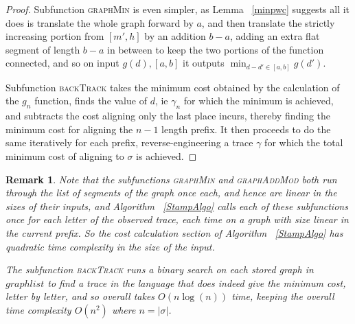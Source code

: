 \documentclass[conference]{IEEEtran}
\newtheorem{remark}{Remark}
\begin{document}
\begin{proof}
		Subfunction \textsc{graphMin} is even simpler, as Lemma ~\ref{minpwc} suggests all it does is translate the whole graph forward by $a$, and then translate the strictly increasing portion from $[m', h]$ by an addition $b-a$, adding an extra flat segment of length $b-a$ in between to keep the two portions of the function connected, and so on input $g(d), [a, b]$ it outputs $\min_{d-d' \in [a,b]}{g(d')}$. 
		
		Subfunction \textsc{backTrack} takes the minimum cost obtained by the calculation of the $g_n$ function, finds the value of $d$, ie $\gamma_n$ for which the minimum is achieved, and subtracts the cost aligning only the last place incurs, thereby finding the minimum cost for aligning the $n-1$ length prefix. 
		It then proceeds to do the same iteratively for each prefix, reverse-engineering a trace $\gamma$ for which the total minimum cost of aligning to $\sigma$ is achieved. 
		
	\end{proof}
	

		\begin{remark} Note that the subfunctions \textsc{graphMin} and  \textsc{graphAddMod} both run through the list of segments of the graph once each, and hence are linear in the sizes of their inputs, and Algorithm ~\ref{StampAlgo} calls each of these subfunctions once for each letter of the observed trace, each time on a graph with size linear in the current prefix.  
			So the cost calculation section of Algorithm ~\ref{StampAlgo} has quadratic time complexity in the size of the input. 
			
			The subfunction \textsc{backTrack} runs a binary search on each stored graph in $graphlist$ to find a trace in the language that does indeed give the minimum cost, letter by letter, and so overall takes $O(n \log(n))$ time, keeping the overall time complexity  $O(n^2)$ where $n = |\sigma|$.
		\end{remark}
\end{document}
